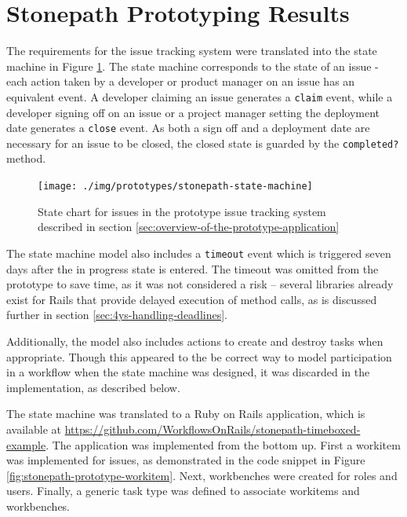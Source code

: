 \documentclass[document.tex]{subfiles}
\begin{document}
\section {Stonepath Prototyping Results}
\label {sec:stonepath-prototyping-results}

The requirements for the issue tracking system were translated into the state machine in Figure \ref{fig:stonepath-prototype-state-machine}. The state machine corresponds to the state of an issue - each action taken by a developer or product manager on an issue has an equivalent event. A developer claiming an issue generates a \verb!claim! event, while a developer signing off on an issue or a project manager setting the deployment date generates a \verb!close! event. As both a sign off and a deployment date are necessary for an issue to be closed, the closed state is guarded by the \verb!completed?! method.

\begin{figure}[!ht]
\centering \texttt{[image: ./img/prototypes/stonepath-state-machine]}
\caption{State chart for issues in the prototype issue tracking system described in section \ref{sec:overview-of-the-prototype-application}}
\label{fig:stonepath-prototype-state-machine}
\end{figure}

The state machine model also includes a \verb!timeout! event which is triggered seven days after the in progress state is entered. The timeout was omitted from the prototype to save time, as it was not considered a risk -- several libraries already exist for Rails that provide delayed execution of method calls, as is discussed further in section \ref{sec:4ys-handling-deadlines}.

Additionally, the model also includes actions to create and destroy tasks when appropriate. Though this appeared to the be correct way to model participation in a workflow when the state machine was designed, it was discarded in the implementation, as described below.

The state machine was translated to a Ruby on Rails application, which is available at \url{https://github.com/WorkflowsOnRails/stonepath-timeboxed-example}. The application was implemented from the bottom up. First a workitem was implemented for issues, as demonstrated in the code snippet in Figure \ref{fig:stonepath-prototype-workitem}. Next, workbenches were created for roles and users. Finally, a generic task type was defined to associate workitems and workbenches.
\end{document}
